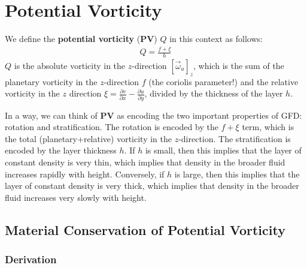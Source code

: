 \section{Potential Vorticity}\label{PV}

We define the \textbf{potential vorticity} (\textbf{PV}) $Q$ in this context as follows:
\begin{align*}
    \boxed{Q = \frac{f+\xi}{h}}
\end{align*}
$Q$ is the absolute vorticity in the $z$-direction $[\vec{\omega}_a]_z$, which is the sum of the planetary vorticity in the $z$-direction $f$ (the coriolis parameter!) and the relative vorticity in the $z$ direction $\xi=\frac{\partial v}{\partial x}-\frac{\partial u}{\partial y}$, divided by the thickness of the layer $h$.

In a way, we can think of \textbf{PV} as encoding the two important properties of GFD: rotation and stratification. The rotation is encoded by the $f+\xi$ term, which is the total (planetary+relative) vorticity in the $z$-direction. The stratification is encoded by the layer thickness $h$. If $h$ is small, then this implies that the layer of constant density is very thin, which implies that density in the broader fluid increases rapidly with height. Conversely, if $h$ is large, then this implies that the layer of constant density is very thick, which implies that density in the broader fluid increases very slowly with height.

\subsection{Material Conservation of Potential Vorticity}

\subsubsection{Derivation}

